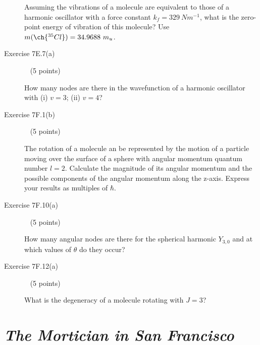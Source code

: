 \documentclass[10pt, letterpaper]{memoir}
\begin{document}
\begin{description}
	      Assuming the vibrations of a  molecule are equivalent to those of a harmonic oscillator with a force constant $k_f=329~Nm^{-1}$, what is the zero-point energy of vibration of this molecule? Use $m(\ch{^{35}Cl})=34.9688~m_u$.

	      \vspace{15em}
	\item [Exercise 7E.7(a)] ~ (5 points)

	      How many nodes are there in the wavefunction of a harmonic oscillator with (i) $v=3$; (ii) $v=4$?

	      \vspace{10em}
	\item [Exercise 7F.1(b)] ~ (5 points)

	      The rotation of a molecule an be represented by the motion of a particle moving over the surface of a sphere with angular momentum quantum number $l=2$. Calculate the magnitude of its angular momentum and the possible components of the angular momentum along the z-axis. Express your results as multiples of $\hbar$.

	      \vspace{10em}
	\item [Exercise 7F.10(a)] ~ (5 points)

	      How many angular nodes are there for the spherical harmonic $Y_{3,0}$ and at which values of $\theta$ do they occur?

	      \vspace{10em}
	\item [Exercise 7F.12(a)] ~ (5 points)

	      What is the degeneracy of a molecule rotating with $J=3$?

\end{description}

\newpage
\pagestyle{empty}
\addtocounter{page}{-1}
\section*{\emph{The Mortician in San Francisco}}
\end{document}
